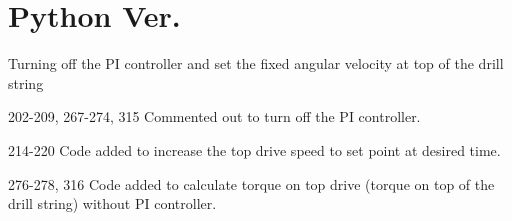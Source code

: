 \section{Python Ver.\ }
Turning off the PI controller and set the fixed angular velocity at top of the drill string

\begin{codemodifications}

\begin{codemodification}{202-209, 267-274, 315}
Commented out to turn off the PI controller.
\end{codemodification}
\begin{codemodification}{214-220}
Code added to increase the top drive speed to set point at desired time.
\end{codemodification}
\begin{codemodification}{276-278, 316}
Code added to calculate torque on top drive (torque on top of the drill string) without PI controller.
\end{codemodification}
\end{codemodifications} 